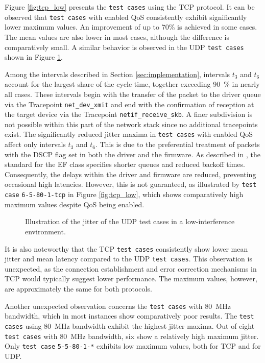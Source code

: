 Figure \ref{fig:tcp_low} presents the \texttt{test cases} using the \ac{TCP} protocol.  
It can be observed that \texttt{test cases} with enabled \ac{QoS} consistently exhibit significantly lower maximum values. 
An improvement of up to 70\% is achieved in some cases.
The mean values are also lower in most cases, although the difference is comparatively small.  
A similar behavior is observed in the \ac{UDP} \texttt{test cases} shown in Figure \ref{fig:udp_low}.  

Among the intervals described in Section \ref{sec:implementation}, intervals $t_3$ and $t_6$ account for the largest share of the cycle time, together exceeding 90~\% in nearly all cases.  
These intervals begin with the transfer of the packet to the driver queue via the Tracepoint \texttt{net\_dev\_xmit} and end with the confirmation of reception at the target device via the Tracepoint \texttt{netif\_receive\_skb}.  
A finer subdivision is not possible within this part of the network stack since no additional tracepoints exist.  
The significantly reduced jitter maxima in \texttt{test cases} with enabled \ac{QoS} affect only intervals $t_3$ and $t_6$.  
This is due to the preferential treatment of packets with the \ac{DSCP} flag set in both the driver and the firmware.  
As described in \cite{rfc3246}, the standard for the \ac{EF} class specifies shorter queues and reduced backoff times.  
Consequently, the delays within the driver and firmware are reduced, preventing occasional high latencies.  
However, this is not guaranteed, as illustrated by \texttt{test case} \texttt{6-5-80-1-tcp} in Figure \ref{fig:tcp_low}, which shows comparatively high maximum values despite \ac{QoS} being enabled.  

\begin{figure}[ht]
    \centering
    \resizebox{\textwidth}{!}{}
    \caption{Illustration of the jitter of the UDP test cases in a low-interference environment.}
    \label{fig:udp_low}
\end{figure}

It is also noteworthy that the \ac{TCP} \texttt{test cases} consistently show lower mean jitter and mean latency compared to the \ac{UDP} \texttt{test cases}.  
This observation is unexpected, as the connection establishment and error correction mechanisms in \ac{TCP} would typically suggest lower performance.  
The maximum values, however, are approximately the same for both protocols.  

Another unexpected observation concerns the \texttt{test cases} with 80~MHz bandwidth, which in most instances show comparatively poor results.  
The \texttt{test cases} using 80~MHz bandwidth exhibit the highest jitter maxima.  
Out of eight \texttt{test cases} with 80~MHz bandwidth, six show a relatively high maximum jitter.  
Only \texttt{test case} \texttt{5-5-80-1-*} exhibits low maximum values, both for \ac{TCP} and for \ac{UDP}.  

